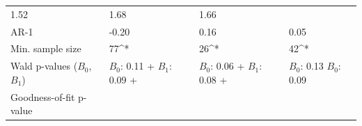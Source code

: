 \documentclass[
]{article}
\begin{document}
\begin{longtable}[]{@{}llll@{}}
\begin{minipage}[t]{0.17\columnwidth}
1.52\strut
\end{minipage} & \begin{minipage}[t]{0.21\columnwidth}\raggedright
1.68\strut
\end{minipage} & \begin{minipage}[t]{0.21\columnwidth}\raggedright
1.66\strut
\end{minipage}\tabularnewline
\begin{minipage}[t]{0.30\columnwidth}\raggedright
AR-1\strut
\end{minipage} & \begin{minipage}[t]{0.17\columnwidth}\raggedright
-0.20\strut
\end{minipage} & \begin{minipage}[t]{0.21\columnwidth}\raggedright
0.16\strut
\end{minipage} & \begin{minipage}[t]{0.21\columnwidth}\raggedright
0.05\strut
\end{minipage}\tabularnewline
\begin{minipage}[t]{0.30\columnwidth}\raggedright
Min. sample size\strut
\end{minipage} & \begin{minipage}[t]{0.17\columnwidth}\raggedright
77\^{}*\strut
\end{minipage} & \begin{minipage}[t]{0.21\columnwidth}\raggedright
26\^{}*\strut
\end{minipage} & \begin{minipage}[t]{0.21\columnwidth}\raggedright
42\^{}*\strut
\end{minipage}\tabularnewline
\begin{minipage}[t]{0.30\columnwidth}\raggedright
Wald p-values (\(B_0\), \(B_1\))\strut
\end{minipage} & \begin{minipage}[t]{0.17\columnwidth}\raggedright
\(B_0\): 0.11 + \(B_1\): 0.09 +\strut
\end{minipage} & \begin{minipage}[t]{0.21\columnwidth}\raggedright
\(B_0\): 0.06 + \(B_1\): 0.08 +\strut
\end{minipage} & \begin{minipage}[t]{0.21\columnwidth}\raggedright
\(B_0\): 0.13 \(B_0\): 0.09\strut
\end{minipage}\tabularnewline
\begin{minipage}[t]{0.30\columnwidth}\raggedright
Goodness-of-fit p-value\strut
\end{minipage} & \begin{minipage}[t]{0.17\columnwidth}\raggedright

\end{minipage}
\end{longtable}
\end{document}
